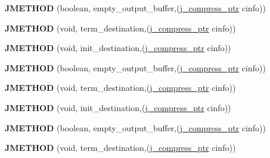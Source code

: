 \begin{DoxyCompactItemize}
\item 
\mbox{\label{structjpeg__destination__mgr_a7357b5d5cab543cfa243dd59f101b8f2}} 
{\bfseries J\+M\+E\+T\+H\+OD} (boolean, empty\+\_\+output\+\_\+buffer,(\hyperlink{structjpeg__compress__struct}{j\+\_\+compress\+\_\+ptr} cinfo))
\item 
\mbox{\label{structjpeg__destination__mgr_a1158df5e49ecfa2a7d0905eef216afbf}} 
{\bfseries J\+M\+E\+T\+H\+OD} (void, term\+\_\+destination,(\hyperlink{structjpeg__compress__struct}{j\+\_\+compress\+\_\+ptr} cinfo))
\item 
\mbox{\label{structjpeg__destination__mgr_ae29d14eb632140c7c67eda8c5824383c}} 
{\bfseries J\+M\+E\+T\+H\+OD} (void, init\+\_\+destination,(\hyperlink{structjpeg__compress__struct}{j\+\_\+compress\+\_\+ptr} cinfo))
\item 
\mbox{\label{structjpeg__destination__mgr_a7357b5d5cab543cfa243dd59f101b8f2}} 
{\bfseries J\+M\+E\+T\+H\+OD} (boolean, empty\+\_\+output\+\_\+buffer,(\hyperlink{structjpeg__compress__struct}{j\+\_\+compress\+\_\+ptr} cinfo))
\item 
\mbox{\label{structjpeg__destination__mgr_a1158df5e49ecfa2a7d0905eef216afbf}} 
{\bfseries J\+M\+E\+T\+H\+OD} (void, term\+\_\+destination,(\hyperlink{structjpeg__compress__struct}{j\+\_\+compress\+\_\+ptr} cinfo))
\item 
\mbox{\label{structjpeg__destination__mgr_ae29d14eb632140c7c67eda8c5824383c}} 
{\bfseries J\+M\+E\+T\+H\+OD} (void, init\+\_\+destination,(\hyperlink{structjpeg__compress__struct}{j\+\_\+compress\+\_\+ptr} cinfo))
\item 
\mbox{\label{structjpeg__destination__mgr_a7357b5d5cab543cfa243dd59f101b8f2}} 
{\bfseries J\+M\+E\+T\+H\+OD} (boolean, empty\+\_\+output\+\_\+buffer,(\hyperlink{structjpeg__compress__struct}{j\+\_\+compress\+\_\+ptr} cinfo))
\item 
\mbox{\label{structjpeg__destination__mgr_a1158df5e49ecfa2a7d0905eef216afbf}} 
{\bfseries J\+M\+E\+T\+H\+OD} (void, term\+\_\+destination,(\hyperlink{structjpeg__compress__struct}{j\+\_\+compress\+\_\+ptr} cinfo))

\end{DoxyCompactItemize}
